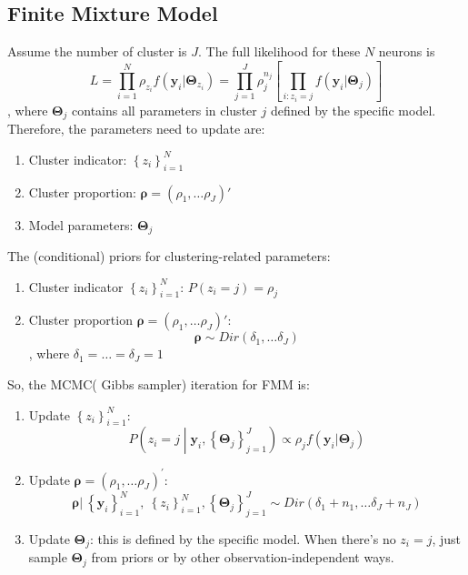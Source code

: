 \documentclass[]{article}
\begin{document}
\subsection{Finite Mixture Model}	
Assume the number of cluster is \(J\). The full likelihood for these \(N\) neurons is
\[L = \prod_{i = 1}^{N}{\rho_{z_{i}}f\left( \mathbf{y}_{i}|\mathbf{\Theta}_{z_{i}} \right)} = \prod_{j = 1}^{J}{\rho_{j}^{n_{j}}\left\lbrack \prod_{i:z_{i} = j}^{}{f\left( \mathbf{y}_{i}|\mathbf{\Theta}_{j} \right)} \right\rbrack}\]
, where \(\mathbf{\Theta}_{j}\) contains all parameters in cluster \(j\) defined by the specific model. Therefore, the parameters need to update are:
\begin{enumerate}
	\def\labelenumi{(\arabic{enumi})}
	\item
	Cluster indicator: \(\left\{ z_{i} \right\}_{i = 1}^{N}\)
	\item
	Cluster proportion: \(\mathbf{\rho} = (\rho_{1},\ldots\rho_{J})'\)
	\item
	Model parameters: \(\mathbf{\Theta}_{j}\)
\end{enumerate}
The (conditional) priors for clustering-related parameters:
\begin{enumerate}
	\def\labelenumi{(\arabic{enumi})}
	\item
	Cluster indicator \(\left\{ z_{i} \right\}_{i = 1}^{N}\):
	\(P\left( z_{i} = j \right) = \rho_{j}\)
	\item
	Cluster proportion \(\mathbf{\rho} = (\rho_{1},\ldots\rho_{J})'\):
	\[\mathbf{\rho} \sim Dir(\delta_{1},\ldots\delta_{J})\]
	, where \(\delta_{1} = \ldots = \delta_{J} = 1\)
\end{enumerate}

So, the MCMC( Gibbs sampler) iteration for FMM is:
\begin{enumerate}
	\def\labelenumi{(\arabic{enumi})}
	\item
	Update \(\left\{ z_{i} \right\}_{i = 1}^{N}\):
	\[P\left( z_{i} = j \middle| \mathbf{y}_{i},\left\{ \mathbf{\Theta}_{j} \right\}_{j = 1}^{J} \right) \propto \rho_{j}f\left( \mathbf{y}_{i}|\mathbf{\Theta}_{j} \right)\]
	\item
	Update \(\mathbf{\rho} = \left( \rho_{1},\ldots\rho_{J} \right)^{'}\):
	\[\mathbf{\rho}|\ \left\{ \mathbf{y}_{i} \right\}_{i = 1}^{N},\ \left\{ z_{i} \right\}_{i = 1}^{N},\left\{ \mathbf{\Theta}_{j} \right\}_{j = 1}^{J} \sim Dir(\delta_{1} + n_{1},\ldots\delta_{J} + n_{J})\]
	\item
	Update \(\mathbf{\Theta}_{j}\): this is defined by the specific model. When there's no
	\(z_{i} = j\), just sample \(\mathbf{\Theta}_{j}\) from priors or by other observation-independent ways.
\end{enumerate}
\end{document}
